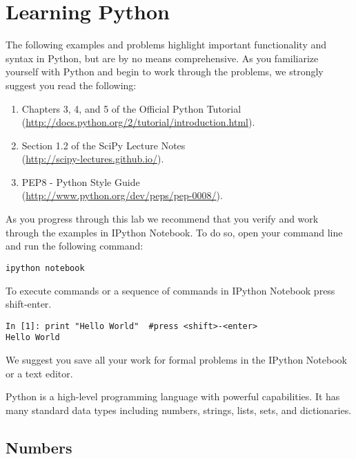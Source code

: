 \section*{Learning Python}

The following examples and problems highlight important functionality and syntax in Python, but are by no means comprehensive.  As you familiarize yourself with Python and begin to work through the problems, we strongly suggest you read the following:

\begin{enumerate}
\item Chapters 3, 4, and 5 of the Official Python Tutorial \\
        (\url{http://docs.python.org/2/tutorial/introduction.html}).
\item Section 1.2 of the SciPy Lecture Notes \\
        (\url{http://scipy-lectures.github.io/}).
\item PEP8 - Python Style Guide \\
        (\url{http://www.python.org/dev/peps/pep-0008/}).
\end{enumerate}


As you progress through this lab we recommend that you verify and work 
through the examples in IPython Notebook. To do so, open your command line and run the following command: 
\begin{lstlisting}
ipython notebook
\end{lstlisting}
To execute commands or a sequence of commands in IPython Notebook press shift-enter.

\begin{lstlisting}
In [1]: print "Hello World"  #press <shift>-<enter>
Hello World
\end{lstlisting}

We suggest you save all your work for formal problems in the 
IPython Notebook or a text editor. 

Python is a high-level programming language with powerful capabilities. 
It has many standard data types including numbers, strings, lists, sets, and dictionaries. 

\subsection*{Numbers}

